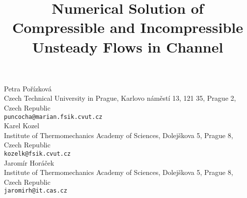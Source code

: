 \documentclass[article,A4,11pt]{llncs}%
\begin{document}
\title{Numerical Solution of Compressible and Incompressible Unsteady Flows in Channel}
 \author{} \institute{}
\maketitle
\begin{center}
{\large Petra Po\v{r}\'izkov\'a}\\
Czech Technical University in Prague, Karlovo n\'am\v{e}st\'i 13, 121 35, Prague 2, Czech Republic\\
{\tt puncocha@marian.fsik.cvut.cz}
\\ \vspace{4mm}
{\large Karel Kozel}\\
Institute of Thermomechanics Academy of Sciences, Dolej\v{s}kova 5, Prague 8, Czech Republic\\
{\tt kozelk@fsik.cvut.cz}
\\ \vspace{4mm}
{\large Jarom\'ir Hor\'a\v{c}ek}\\
Institute of Thermomechanics Academy of Sciences, Dolej\v{s}kova 5, Prague 8, Czech Republic\\
{\tt jaromirh@it.cas.cz}
\end{center}
\end{document}
